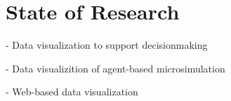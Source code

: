 \hypertarget{state-of-research-main}{%
\section{State of Research}
\label{research-main}}

- Data visualization to support decisionmaking

- Data visualizition of agent-based microsimulation

- Web-based data visualization


